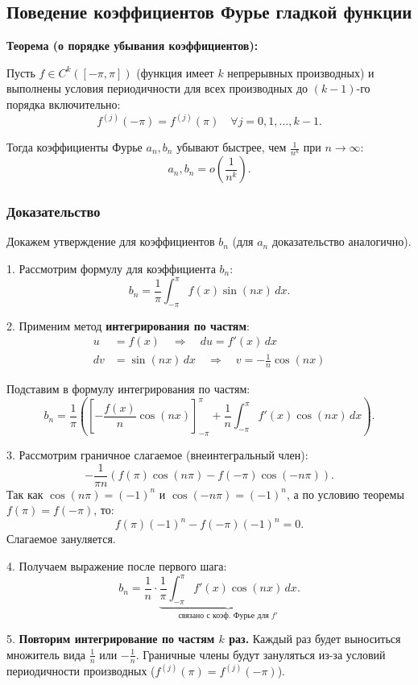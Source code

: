 \documentclass[12pt,a4paper,openany]{book}
\begin{document}
\newpage

\subsection{Поведение коэффициентов Фурье гладкой функции}

\textbf{Теорема (о порядке убывания коэффициентов):}

Пусть $f \in C^k([-\pi, \pi])$ (функция имеет $k$ непрерывных производных) и выполнены условия периодичности для всех производных до $(k-1)$-го порядка включительно:
$$ f^{(j)}(-\pi) = f^{(j)}(\pi) \quad \forall j = 0, 1, \dots, k-1. $$

Тогда коэффициенты Фурье $a_n, b_n$ убывают быстрее, чем $\frac{1}{n^k}$ при $n \to \infty$:
$$ a_n, b_n = o\left(\frac{1}{n^k}\right). $$

\subsubsection*{Доказательство}

Докажем утверждение для коэффициентов $b_n$ (для $a_n$ доказательство аналогично).

1. Рассмотрим формулу для коэффициента $b_n$:
$$ b_n = \frac{1}{\pi} \int_{-\pi}^{\pi} f(x) \sin(nx) \, dx. $$

2. Применим метод \textbf{интегрирования по частям}:
\begin{align*}
u &= f(x) \quad \Rightarrow \quad du = f'(x) \, dx \\
dv &= \sin(nx) \, dx \quad \Rightarrow \quad v = -\frac{1}{n} \cos(nx)
\end{align*}

Подставим в формулу интегрирования по частям:
$$ b_n = \frac{1}{\pi} \left( \left[ -\frac{f(x)}{n} \cos(nx) \right]_{-\pi}^{\pi} + \frac{1}{n} \int_{-\pi}^{\pi} f'(x) \cos(nx) \, dx \right). $$

3. Рассмотрим граничное слагаемое (внеинтегральный член):
$$ -\frac{1}{\pi n} \left( f(\pi)\cos(n\pi) - f(-\pi)\cos(-n\pi) \right). $$
Так как $\cos(n\pi) = (-1)^n$ и $\cos(-n\pi) = (-1)^n$, а по условию теоремы $f(\pi) = f(-\pi)$, то:
$$ f(\pi)(-1)^n - f(-\pi)(-1)^n = 0. $$
Слагаемое зануляется.

4. Получаем выражение после первого шага:
$$ b_n = \frac{1}{n} \cdot \underbrace{\frac{1}{\pi} \int_{-\pi}^{\pi} f'(x) \cos(nx) \, dx}_{\text{связано с коэф. Фурье для } f'}. $$

5. \textbf{Повторим интегрирование по частям $k$ раз.}
Каждый раз будет выноситься множитель вида $\frac{1}{n}$ или $-\frac{1}{n}$.
Граничные члены будут зануляться из-за условий периодичности производных ($f^{(j)}(\pi) = f^{(j)}(-\pi)$).
\end{document}
